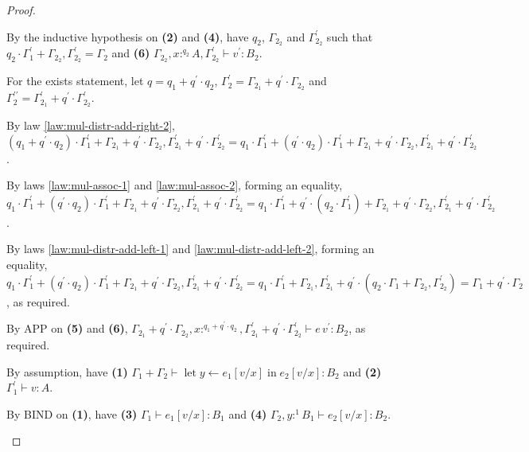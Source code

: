 \documentclass[acmsmall,screen,nonacm]{acmart}
\DeclareMathOperator{\llet}{\text{let}}
\DeclareMathOperator{\lin}{\text{in}}
\newcommand{\tee}{\vdash}
\begin{document}
\begin{proof}
\begin{description}
    By the inductive hypothesis on \textbf{(2)} and \textbf{(4)}, have $q_2$, $\Gamma_{2_2}$ and $\Gamma_{2_2}^\prime$ such that $q_2 \cdot \Gamma_1^\prime + \Gamma_{2_2}, \Gamma_{2_2}^\prime = \Gamma_2$ and \textbf{(6)} $\Gamma_{2_2}, x :^{q_2} A, \Gamma_{2_2}^\prime \tee v^\prime : B_2$.

    For the exists statement, let $q = q_1 + q^\prime \cdot q_2$, $\Gamma_2^\prime = \Gamma_{2_1} + q^\prime \cdot \Gamma_{2_2}$ and $\Gamma_2^{\prime\prime} = \Gamma_{2_1}^\prime + q^\prime \cdot \Gamma_{2_2}^\prime$.

    By law \ref{law:mul-distr-add-right-2}, $(q_1 + q^\prime \cdot q_2) \cdot \Gamma_1^\prime + \Gamma_{2_1} + q^\prime \cdot \Gamma_{2_2}, \Gamma_{2_1}^\prime + q^\prime \cdot \Gamma_{2_2}^\prime = q_1 \cdot \Gamma_1^\prime + (q^\prime \cdot q_2) \cdot \Gamma_1^\prime + \Gamma_{2_1} + q^\prime \cdot \Gamma_{2_2}, \Gamma_{2_1}^\prime + q^\prime \cdot \Gamma_{2_2}^\prime$. 
    
    By laws \ref{law:mul-assoc-1} and \ref{law:mul-assoc-2}, forming an equality, $q_1 \cdot \Gamma_1^\prime + (q^\prime \cdot q_2) \cdot \Gamma_1^\prime + \Gamma_{2_1} + q^\prime \cdot \Gamma_{2_2}, \Gamma_{2_1}^\prime + q^\prime \cdot \Gamma_{2_2}^\prime = q_1 \cdot \Gamma_1^\prime + q^\prime \cdot (q_2 \cdot \Gamma_1^\prime) + \Gamma_{2_1} + q^\prime \cdot \Gamma_{2_2}, \Gamma_{2_1}^\prime + q^\prime \cdot \Gamma_{2_2}^\prime$. 
    
    By laws \ref{law:mul-distr-add-left-1} and \ref{law:mul-distr-add-left-2}, forming an equality, $q_1 \cdot \Gamma_1^\prime + (q^\prime \cdot q_2) \cdot \Gamma_1^\prime + \Gamma_{2_1} + q^\prime \cdot \Gamma_{2_2}, \Gamma_{2_1}^\prime + q^\prime \cdot \Gamma_{2_2}^\prime = q_1 \cdot \Gamma_1^\prime + \Gamma_{2_1}, \Gamma_{2_1}^\prime + q^\prime \cdot (q_2 \cdot \Gamma_1 + \Gamma_{2_2}, \Gamma_{2_2}^\prime) = \Gamma_1 + q^\prime \cdot \Gamma_2$, as required.

    By APP on \textbf{(5)} and \textbf{(6)}, $\Gamma_{2_1} + q^\prime \cdot \Gamma_{2_2}, x :^{q_1 + q^\prime \cdot q_2}, \Gamma_{2_1}^\prime + q^\prime \cdot \Gamma_{2_2}^\prime \tee e \, v^\prime : B_2$, as required.
    \\
    \item[Case BIND.] 
    By assumption, have \textbf{(1)} $\Gamma_1 + \Gamma_2 \tee \llet y \leftarrow e_1[v/x] \lin e_2[v/x] : B_2$ and \textbf{(2)} $\Gamma_1^\prime \tee v : A$.
    
    By BIND on \textbf{(1)}, have \textbf{(3)} $\Gamma_1 \tee e_1[v/x] : B_1$ and \textbf{(4)} $\Gamma_2, y :^1 B_1 \tee e_2[v/x] : B_2$.


\end{description}
\end{proof}
\end{document}
